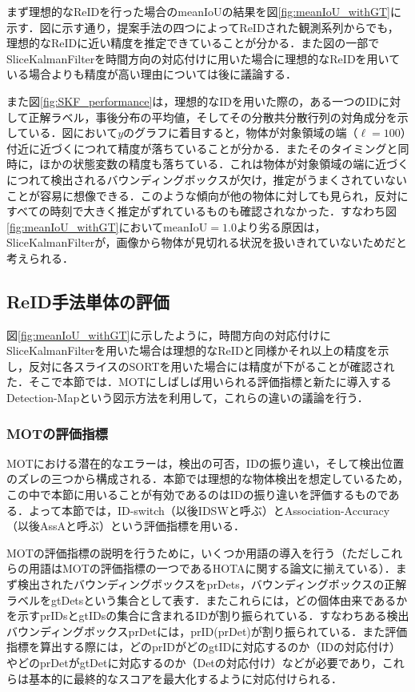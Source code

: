         まず理想的なReIDを行った場合のmeanIoUの結果を図\ref{fig:meanIoU_withGT}に示す．図に示す通り，提案手法の四つによってReIDされた観測系列からでも，理想的なReIDに近い精度を推定できていることが分かる．また図の一部でSliceKalmanFilterを時間方向の対応付けに用いた場合に理想的なReIDを用いている場合よりも精度が高い理由については後に議論する．

        また図\ref{fig:SKF_performance}は，理想的なIDを用いた際の，ある一つのIDに対して正解ラベル，事後分布の平均値，そしてその分散共分散行列の対角成分を示している．図において$y$のグラフに着目すると，物体が対象領域の端（$\ell = 100$）付近に近づくにつれて精度が落ちていることが分かる．またそのタイミングと同時に，ほかの状態変数の精度も落ちている．これは物体が対象領域の端に近づくにつれて検出されるバウンディングボックスが欠け，推定がうまくされていないことが容易に想像できる．このような傾向が他の物体に対しても見られ，反対にすべての時刻で大きく推定がずれているものも確認されなかった．すなわち図\ref{fig:meanIoU_withGT}において$\text{meanIoU} = 1.0$より劣る原因は，SliceKalmanFilterが，画像から物体が見切れる状況を扱いきれていないためだと考えられる．

    \subsection{ReID手法単体の評価}
    \label{subsec:evaluate_reidentification}

    図\ref{fig:meanIoU_withGT}に示したように，時間方向の対応付けにSliceKalmanFilterを用いた場合は理想的なReIDと同様かそれ以上の精度を示し，反対に各スライスのSORTを用いた場合には精度が下がることが確認された．そこで本節では．MOTにしばしば用いられる評価指標と新たに導入するDetection-Mapという図示方法を利用して，これらの違いの議論を行う．

    \subsubsection{MOTの評価指標}

    MOTにおける潜在的なエラーは，検出の可否，IDの振り違い，そして検出位置のズレの三つから構成される．本節では理想的な物体検出を想定しているため，この中で本節に用いることが有効であるのはIDの振り違いを評価するものである．よって本節では，ID-switch（以後IDSWと呼ぶ）とAssociation-Accuracy（以後AssAと呼ぶ）という評価指標を用いる．

    MOTの評価指標の説明を行うために，いくつか用語の導入を行う（ただしこれらの用語はMOTの評価指標の一つであるHOTAに関する論文\cite{luiten2021hota}に揃えている）．まず検出されたバウンディングボックスをprDets，バウンディングボックスの正解ラベルをgtDetsという集合として表す．またこれらには，どの個体由来であるかを示すprIDsとgtIDsの集合に含まれるIDが割り振られている．すなわちある検出バウンディングボックスprDetには，prID(prDet)が割り振られている．また評価指標を算出する際には，どのprIDがどのgtIDに対応するのか（IDの対応付け）やどのprDetがgtDetに対応するのか（Detの対応付け）などが必要であり，これらは基本的に最終的なスコアを最大化するように対応付けられる．

